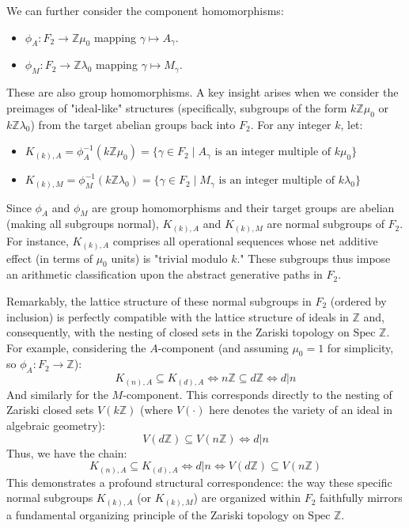 We can further consider the component homomorphisms:
\begin{itemize}
    \item $\phi_A: F_2 \to \mathbb{Z}\mu_0$ mapping $\gamma \mapsto A_\gamma$.
    \item $\phi_M: F_2 \to \mathbb{Z}\lambda_0$ mapping $\gamma \mapsto M_\gamma$.
\end{itemize}
These are also group homomorphisms. A key insight arises when we consider the preimages of "ideal-like" structures (specifically, subgroups of the form $k\mathbb{Z}\mu_0$ or $k\mathbb{Z}\lambda_0$) from the target abelian groups back into $F_2$. For any integer $k$, let:
\begin{itemize}
    \item $K_{(k),A} = \phi_A^{-1}(k\mathbb{Z}\mu_0) = \{ \gamma \in F_2 \mid A_\gamma \text{ is an integer multiple of } k\mu_0 \}$
    \item $K_{(k),M} = \phi_M^{-1}(k\mathbb{Z}\lambda_0) = \{ \gamma \in F_2 \mid M_\gamma \text{ is an integer multiple of } k\lambda_0 \}$
\end{itemize}
Since $\phi_A$ and $\phi_M$ are group homomorphisms and their target groups are abelian (making all subgroups normal), $K_{(k),A}$ and $K_{(k),M}$ are normal subgroups of $F_2$. For instance, $K_{(k),A}$ comprises all operational sequences whose net additive effect (in terms of $\mu_0$ units) is "trivial modulo $k$." These subgroups thus impose an arithmetic classification upon the abstract generative paths in $F_2$.

Remarkably, the lattice structure of these normal subgroups in $F_2$ (ordered by inclusion) is perfectly compatible with the lattice structure of ideals in $\mathbb{Z}$ and, consequently, with the nesting of closed sets in the Zariski topology on $\text{Spec } \mathbb{Z}$. For example, considering the $A$-component (and assuming $\mu_0=1$ for simplicity, so $\phi_A: F_2 \to \mathbb{Z}$):
\[ K_{(n),A} \subseteq K_{(d),A} \iff n\mathbb{Z} \subseteq d\mathbb{Z} \iff d|n \]
And similarly for the $M$-component. This corresponds directly to the nesting of Zariski closed sets $V(k\mathbb{Z})$ (where $V(\cdot)$ here denotes the variety of an ideal in algebraic geometry):
\[ V(d\mathbb{Z}) \subseteq V(n\mathbb{Z}) \iff d|n \]
Thus, we have the chain:
\[ K_{(n),A} \subseteq K_{(d),A} \iff d|n \iff V(d\mathbb{Z}) \subseteq V(n\mathbb{Z}) \]
This demonstrates a profound structural correspondence: the way these specific normal subgroups $K_{(k),A}$ (or $K_{(k),M}$) are organized within $F_2$ faithfully mirrors a fundamental organizing principle of the Zariski topology on $\text{Spec } \mathbb{Z}$.

